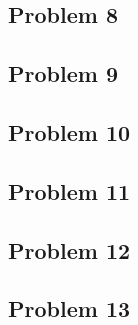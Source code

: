 \documentclass{article}
\begin{document}
\begin{center}

\end{center}

\subsection*{Problem 8}
\subsection*{Problem 9}

\begin{center}

\end{center}

\subsection*{Problem 10}


\begin{center}

\end{center}

\subsection*{Problem 11}

\begin{center}

\end{center}


\subsection*{Problem 12}

\begin{center}

\end{center}

\begin{center}

\end{center}

\subsection*{Problem 13}

%
\end{document}
